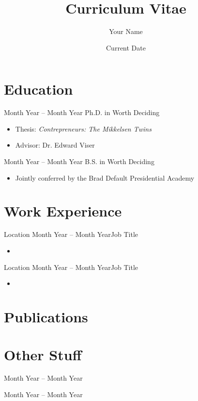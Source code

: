 \documentclass[11pt]{cv}
\title{Curriculum Vitae}            %
\author{Your Name}
\date{Current Date}
\begin{document}
\maketitle




\section{Education}

{Month Year -- Month Year}
{Ph.D. in Worth Deciding}{}{%
    \begin{itemize}
        \item Thesis: \textit{Contrepreneurs: The Mikkelsen Twins}
        \item Advisor: Dr. Edward Viser
    \end{itemize}
}

{Month Year -- Month Year}
{B.S. in Worth Deciding}{}{%
    \begin{itemize}
        \item Jointly conferred by the Brad Default Presidential Academy
    \end{itemize}
}




\section{Work Experience}

{Location}
{Month Year -- Month Year}{Job Title}{}{%
    \begin{itemize}
        \item \lipsum[1][1-3]
    \end{itemize}
}

{Location}
{Month Year -- Month Year}{Job Title}{}{%
    \begin{itemize}
        \item \lipsum[1][4-5]
    \end{itemize}
}




\section{Publications}

\nocite{*}
\printbibliography[heading=none]




\section{Other Stuff}

{Month Year -- Month Year}{}{}{}

{Month Year -- Month Year}{}{}{}
\end{document}

